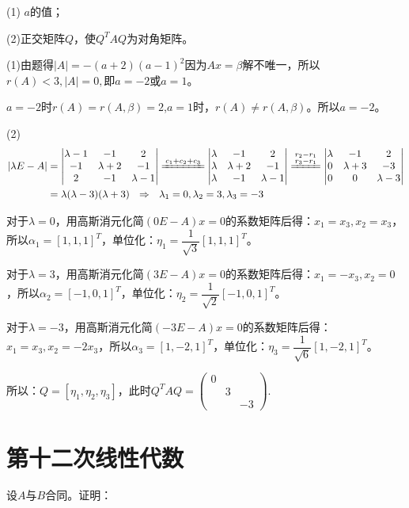 \documentclass[a4paper]{report}
\begin{document}
(1) $a$的值；

(2)正交矩阵$Q$，使$Q^TAQ$为对角矩阵。

\begin{jie}
(1)由题得$|A|=-(a+2)(a-1)^2$因为$Ax=\beta$解不唯一，所以$r(A)<3,|A|=0,$即$a=-2$或$a=1$。

$a=-2$时$r(A)=r(A,\beta)=2$,$a=1$时，$r(A)\neq r(A,\beta)$。所以$a=-2$。

(2)
\begin{align*}
|\lambda E-A|&=
\begin{vmatrix}
\lambda -1&-1&2\\
-1&\lambda+2&-1\\
2&-1&\lambda -1
\end{vmatrix}
\xlongequal{c_1+c_2+c_3}
\begin{vmatrix}
\lambda&-1&2\\
\lambda&\lambda+2&-1\\
\lambda&-1&\lambda -1
\end{vmatrix}\xlongequal{\substack{r_2-r_1\\ r_3-r_1}}
\begin{vmatrix}
\lambda&-1&2\\
0&\lambda+3&-3\\
0&0&\lambda -3
\end{vmatrix}\\&=\lambda(\lambda-3)(\lambda+3)~~\Rightarrow~~\lambda_1=0,\lambda_2=3,\lambda_3=-3
\end{align*}

对于$\lambda=0$，用高斯消元化简$(0E-A)x=0$的系数矩阵后得：$x_1=x_3,x_2=x_3$，所以$\alpha_1=[1,1,1]^T$，单位化：$\eta_1=\dfrac{1}{\sqrt{3}}[1,1,1]^T$。

对于$\lambda=3$，用高斯消元化简$(3E-A)x=0$的系数矩阵后得：$x_1=-x_3,x_2=0$，所以$\alpha_2=[-1,0,1]^T$，单位化：$\eta_2=\dfrac{1}{\sqrt{2}}[-1,0,1]^T$。

对于$\lambda=-3$，用高斯消元化简$(-3E-A)x=0$的系数矩阵后得：$x_1=x_3,x_2=-2x_3$，所以$\alpha_3=[1,-2,1]^T$，单位化：$\eta_3=\dfrac{1}{\sqrt{6}}[1,-2,1]^T$。

所以：$Q=[\eta_1,\eta_2,\eta_3]$，此时$Q^TAQ=
\begin{pmatrix}
0\\&3\\&&-3
\end{pmatrix}
$.
\end{jie}

\chapter{第十二次线性代数}
\EX 设$A$与$B$合同。证明：
\end{document}
